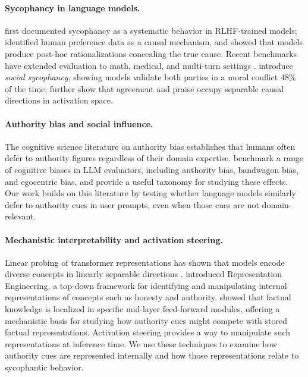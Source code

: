 \documentclass{article}
\begin{document}
\paragraph{Sycophancy in language models.}
\citet{perez2022discovering} first documented sycophancy as a systematic behavior in RLHF-trained models; \citet{sharma2024towards} identified human preference data as a causal mechanism, and \citet{turpin2023language} showed that models produce post-hoc rationalizations concealing the true cause. Recent benchmarks have extended evaluation to math, medical, and multi-turn settings \citep{fanous2025syceval, hong2025measuring, malmqvist2024sycophancy}. \citet{cheng2025elephant} introduce \textit{social sycophancy}, showing models validate both parties in a moral conflict 48\% of the time; \citet{vennemeyer2025sycophancy} further show that agreement and praise occupy separable causal directions in activation space.

\paragraph{Authority bias and social influence.}
The cognitive science literature on authority bias \citep{milgram1963behavioral} establishes that humans often defer to authority figures regardless of their domain expertise. \citet{koo2024benchmarking} benchmark a range of cognitive biases in LLM evaluators, including authority bias, bandwagon bias, and egocentric bias, and provide a useful taxonomy for studying these effects. Our work builds on this literature by testing whether language models similarly defer to authority cues in user prompts, even when those cues are not domain-relevant.

\paragraph{Mechanistic interpretability and activation steering.}
Linear probing of transformer representations has shown that models encode diverse concepts in linearly separable directions \citep{burns2023discovering, li2024inference, marks2023geometry}. \citet{zou2023representation} introduced Representation Engineering, a top-down framework for identifying and manipulating internal representations of concepts such as honesty and authority. \citet{meng2022locating} showed that factual knowledge is localized in specific mid-layer feed-forward modules, offering a mechanistic basis for studying how authority cues might compete with stored factual representations. Activation steering \citep{turner2023activation, rimsky2024steering} provides a way to manipulate such representations at inference time. We use these techniques to examine how authority cues are represented internally and how those representations relate to sycophantic behavior.
\end{document}
